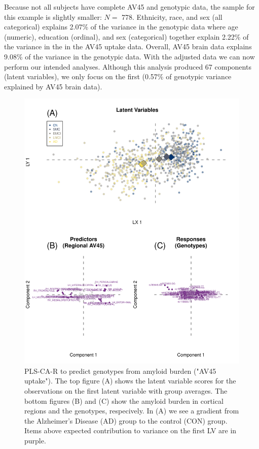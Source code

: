 \documentclass[12pt]{article}
\begin{document}
Because not all subjects have complete AV45 and genotypic data, the
sample for this example is slightly smaller: \(N=\) 778. Ethnicity,
race, and sex (all categorical) explains 2.07\% of the variance in the
genotypic data where age (numeric), education (ordinal), and sex
(categorical) together explain 2.22\% of the variance in the in the AV45
uptake data. Overall, AV45 brain data explains 9.08\% of the variance in
the genotypic data. With the adjusted data we can now perform our
intended analyses. Although this analysis produced 67 components (latent
variables), we only focus on the first (0.57\% of genotypic variance
explained by AV45 brain data).

\begin{figure}[!hbtp]

{\centering \includegraphics[width=.8\textwidth,height=.8\textheight]{PLSCAR_to_a_GPLS_blind_files/figure-latex/unnamed-chunk-12-1} 

}

\caption{\label{fig:brain_genotypes_ex2} PLS-CA-R to predict genotypes from amyloid burden ("AV45 uptake"). The top figure (A) shows the latent variable scores for the observations on the first latent variable with group averages. The bottom figures (B) and (C) show the amyloid burden in cortical regions and the genotypes, respecively. In (A) we see a gradient from the Alzheimer's Disease (AD) group to the control (CON) group. Items above expected contribution to variance on the first LV are in purple.}\label{fig:unnamed-chunk-12}
\end{figure}
\end{document}
